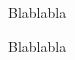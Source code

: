 \documentclass{article}
\begin{document}
Blablabla

\newpage

\printindex

\newpage

Blablabla
\end{document}
